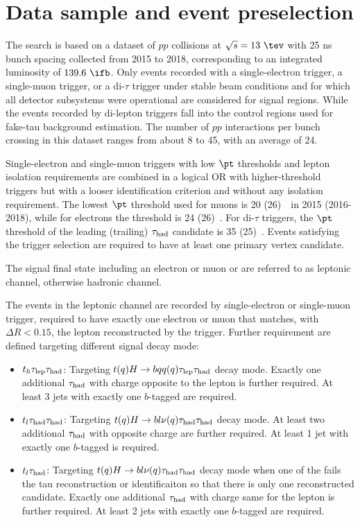 \section{Data sample and event preselection}
\label{sec:data_presel}

The search is based on a dataset of $pp$ collisions at $\sqrt{s}=13~\tev$ with 25 ns bunch spacing collected from 2015 to 2018, corresponding to an integrated luminosity of $139.6~\ifb$.
Only events recorded with a single-electron trigger, a single-muon trigger, or a di-$\tau$ trigger under stable beam conditions 
and for which all detector subsystems were operational are considered for signal regions. While the events recorded by di-lepton triggers fall into the control regions used for fake-tau background estimation.
The number of $pp$ interactions per bunch crossing in this dataset ranges from about 8 to 45, with an average of 24.

Single-electron and single-muon triggers with low $\pt$ thresholds and lepton isolation requirements are combined in a logical OR 
with higher-threshold triggers but with a looser identification criterion and without any isolation requirement.
The lowest $\pt$ threshold used for muons is 20 (26)~\gev\ in 2015 (2016-2018), while for electrons the threshold is 24 (26)~\gev.
For di-$\tau$ triggers, the $\pt$ threshold of the leading (trailing) $\tau_{\mathrm{had}}$ candidate is 35 (25)~\gev.
Events satisfying the trigger selection are required to have at least one primary vertex candidate.

The signal final state including an electron or muon or \lep are referred to as leptonic channel, otherwise hadronic channel.

The events in the leptonic channel are recorded by single-electron or single-muon trigger, required to have exactly one electron or muon that matches, with $\Delta R < 0.15$, the lepton reconstructed by the trigger. Further requirement are defined targeting different signal decay mode:  
\begin{itemize}
	\item $t_h\tau_{\mathrm{lep}} \tau_{\mathrm{had}}$: Targeting $t(q)H\to bqq(q)\tau_{\mathrm{lep}} \tau_{\mathrm{had}}$ decay mode. Exactly one additional $\tau_{\mathrm{had}}$ with charge opposite to the lepton is further required. At least 3 jets with exactly one $b$-tagged are required.
	\item $t_l\tau_{\mathrm{had}} \tau_{\mathrm{had}}$: Targeting $t(q)H\to bl\nu(q)\tau_{\mathrm{had}} \tau_{\mathrm{had}}$ decay mode. At least two additional $\tau_{\mathrm{had}}$ with opposite charge are further required. At least 1 jet with exactly one $b$-tagged is required.
	\item $t_l\tau_{\mathrm{had}}$: Targeting $t(q)H\to bl\nu(q)\tau_{\mathrm{had}} \tau_{\mathrm{had}}$ decay mode when one of the \had fails the tau reconstruction or identificaiton so that there is only one reconstructed \had candidate. Exactly one additional $\tau_{\mathrm{had}}$ with charge same for the lepton is further required. At least 2 jets with exactly one $b$-tagged are required.
\end{itemize}

